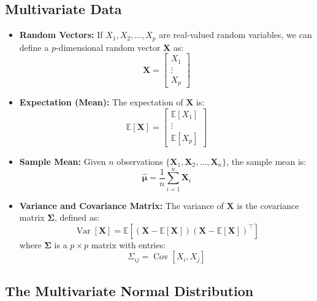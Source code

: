 \documentclass{article}
\begin{document}
\subsection{Multivariate Data}

\begin{itemize}
    \item \textbf{Random Vectors:} If $X_1, X_2, \ldots, X_p$ are real-valued random variables, we can define a $p$-dimensional random vector $\mathbf{X}$ as:
    \[
    \mathbf{X} = \begin{bmatrix} X_1 \\ \vdots \\ X_p \end{bmatrix}
    \]
    \item \textbf{Expectation (Mean):} The expectation of $\mathbf{X}$ is:
    \[
    \mathbb{E}[\mathbf{X}] = \begin{bmatrix} \mathbb{E}[X_1] \\ \vdots \\ \mathbb{E}[X_p] \end{bmatrix}
    \]
    \item \textbf{Sample Mean:} Given $n$ observations $\{\mathbf{X}_1, \mathbf{X}_2, \ldots, \mathbf{X}_n\}$, the sample mean is:
    \[
    \hat{\boldsymbol{\mu}} = \frac{1}{n} \sum_{i=1}^n \mathbf{X}_i
    \]
    \item \textbf{Variance and Covariance Matrix:} The variance of $\mathbf{X}$ is the covariance matrix $\boldsymbol{\Sigma}$, defined as:
    \[
    \operatorname{Var}[\mathbf{X}] = \mathbb{E}\left[(\mathbf{X} - \mathbb{E}[\mathbf{X}]) (\mathbf{X} - \mathbb{E}[\mathbf{X}])^\top\right]
    \]
    where $\boldsymbol{\Sigma}$ is a $p \times p$ matrix with entries:
    \[
    \Sigma_{ij} = \operatorname{Cov}[X_i, X_j]
    \]
\end{itemize}

\subsection{The Multivariate Normal Distribution}
\end{document}
